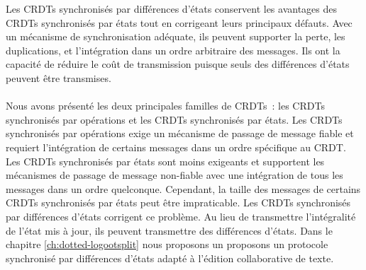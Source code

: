 Les \acp{CRDT} synchronisés par différences d'états conservent les avantages des \acp{CRDT} synchronisés par états tout en corrigeant leurs principaux défauts.
Avec un mécanisme de synchronisation adéquate, ils peuvent supporter la perte, les duplications, et l'intégration dans un ordre arbitraire des messages.
Ils ont la capacité de réduire le coût de transmission puisque seuls des différences d'états peuvent être transmises.


\paragraph{} Nous avons présenté les deux principales familles de \acp{CRDT}~: les \acp{CRDT} synchronisés par opérations et les \acp{CRDT} synchronisés par états.
Les \acp{CRDT} synchronisés par opérations exige un mécanisme de passage de message fiable et requiert l'intégration de certains messages dans un ordre spécifique au \ac{CRDT}.
Les \acp{CRDT} synchronisés par états sont moins exigeants et supportent les mécanismes de passage de message non-fiable avec une intégration de tous les messages dans un ordre quelconque.
Cependant, la taille des messages de certains \acp{CRDT} synchronisés par états peut être impraticable.
Les \acp{CRDT} synchronisés par différences d'états corrigent ce problème.
Au lieu de transmettre l'intégralité de l'état mis à jour, ils peuvent transmettre des différences d'états.
Dans le chapitre \autoref{ch:dotted-logootsplit} nous proposons un proposons un protocole synchronisé par différences d'états adapté à l'édition collaborative de texte.
